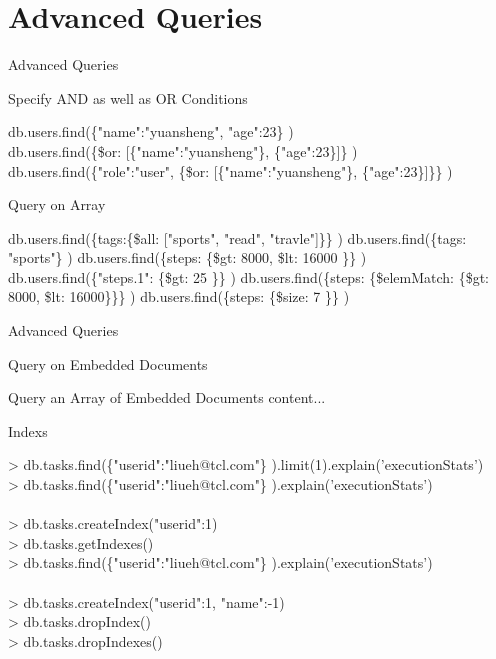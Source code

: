 \documentclass{beamer}
\begin{document}
\section{Advanced Queries}
\begin{frame}{Advanced Queries}
	\scriptsize
	\begin{block}{Specify AND as well as OR Conditions}
		\begin{Alms*}
			db.users.find(\NI \{"name":"yuansheng", "age":23\} \ND) \\
			db.users.find(\NI \{\$or: [\{"name":"yuansheng"\}, \{"age":23\}]\} \ND)
			db.users.find(\NI \{"role":"user", \{\$or: [\{"name":"yuansheng"\}, \{"age":23\}]\}\} \ND)
		\end{Alms*}
	\end{block}

	\begin{block}{Query on Array}
		\begin{Alms*}
			db.users.find(\NI \{tags:\{\$all: ["sports", "read", "travle"]\}\} \ND)
			db.users.find(\NI \{tags: "sports"\} \ND)
			db.users.find(\NI \{steps: \{\$gt: 8000, \$lt: 16000 \}\} \ND)
			db.users.find(\NI \{"steps.1": \{\$gt: 25 \}\} \ND)
			db.users.find(\NI \{steps: \{\$elemMatch: \{\$gt: 8000, \$lt: 16000\}\}\} \ND)
			db.users.find(\NI \{steps: \{\$size: 7 \}\} \ND)
		\end{Alms*}
	\end{block}

\end{frame}

\begin{frame}{Advanced Queries}
	\scriptsize
	\begin{block}{Query on Embedded Documents}
		\begin{Alms*}
		\end{Alms*}
	\end{block}
	
	\begin{block}{Query an Array of Embedded Documents}
		content...
	\end{block}
\end{frame}

\begin{frame}{Indexs}
	\scriptsize
	\begin{Alms*}
		> db.tasks.find(\NI\{"userid":"liueh@tcl.com"\}
		\ND).limit(1).explain('executionStats') \\
		> db.tasks.find(\NI\{"userid":"liueh@tcl.com"\}
		\ND).explain('executionStats') \\
		\\
		> db.tasks.createIndex({"userid":1}) \\
		> db.tasks.getIndexes() \\
		> db.tasks.find(\NI\{"userid":"liueh@tcl.com"\}
		\ND).explain('executionStats') \\
		\\
		> db.tasks.createIndex({"userid":1, "name":-1}) \\
		> db.tasks.dropIndex() \\
		> db.tasks.dropIndexes()
	\end{Alms*}
\end{frame}
\end{document}
